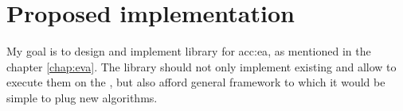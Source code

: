 \chapter{Proposed implementation}
\label{chap:impl}

My goal is to design and implement library for \acrlong{acc:ea}, as mentioned in the chapter \ref{chap:eva}. The library should not only implement existing  and allow to execute them on the \gpuns, but also afford general framework to which it would be simple to plug new algorithms.
